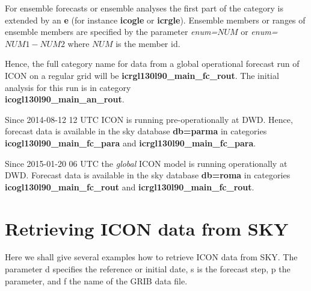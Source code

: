 For ensemble forecasts or ensemble analyses the first part of the
category is extended by an \textbf{e} (for instance \textbf{icogle}
or \textbf{icrgle}). Ensemble members or ranges of ensemble members
are specified by the parameter \emph{enum=}$NUM$
or \emph{enum=}$NUM1-NUM2$ where $NUM$ is the member id.

Hence, the full category name for data from a global operational forecast run of ICON on a
regular grid will be \textbf{icrgl130l90\_main\_fc\_rout}. The initial analysis for this
run is in category\\ \textbf{icogl130l90\_main\_an\_rout}.

\begin{note}
Since 2014-08-12 12 UTC ICON is running pre-operationally at DWD. Hence, forecast data
is available in the sky database \textbf{db=parma} in categories
\textbf{icogl130l90\_main\_fc\_para} and \textbf{icrgl130l90\_main\_fc\_para}.
\end{note}

\begin{note}
Since 2015-01-20 06 UTC the \emph{global} ICON model is running operationally at DWD.
Forecast data is available in the sky database \textbf{db=roma} in categories
\textbf{icogl130l90\_main\_fc\_rout} and \textbf{icrgl130l90\_main\_fc\_rout}.
\end{note}

\section{Retrieving ICON data from SKY}\label{sec_example}

Here we shall give several examples how to retrieve ICON data from SKY.
The parameter d specifies the reference or initial date, s is the forecast step, p the parameter,
and f the name of the GRIB data file.

